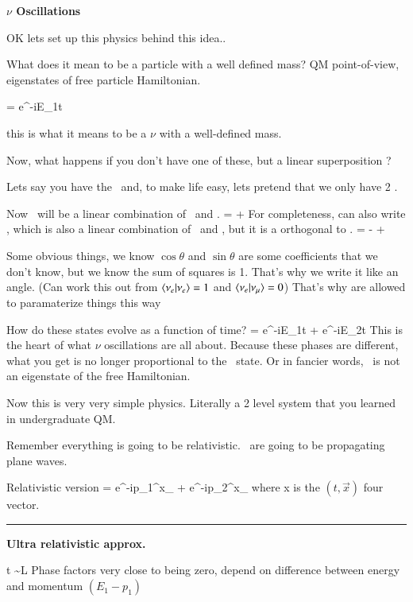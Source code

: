{\textbf{$\nu$ Oscillations}

OK lets set up this physics behind this idea.. 

What does it mean to be a particle with a well defined mass?
QM point-of-view, eigenstates of free particle Hamiltonian. 

\be
{} =  e^{-iE_1t} \ket{\nuone}
\ee

this is what it means to be a $\nu$ with a well-defined mass.

Now, what happens if you don't have one of these, but a linear superposition  ?

Lets say you have the \nue\ and, to make life easy, lets pretend that we only have 2 \nus. 

Now \nue\ will be a linear combination of \nuone\ and \nutwo. 
\be
\ket{\nue} = \cos\theta \ket{\nuone} + \sin\theta \ket{\nutwo}
\ee
For completeness, can also write \numu, which is also a linear combination of \nuone\ and \nutwo, but it is a orthogonal to \nue.
\be
\ket{\numu} = -\sin\theta \ket{\nuone} + \cos\theta \ket{\nutwo}
\ee


Some obvious things, we know $\cos\theta$ and $\sin\theta$ are some coefficients that we don't know, but we know the sum of squares is 1. 
That's why we write it like an angle.
(Can work this out from  $\braket{\nu_e | \nu_e}  = 1$ and $\braket{\nu_e | \nu_\mu}  = 0$)
That's why are allowed to paramaterize things this way

How do these states evolve as a function of time?
\be
{} = \cos\theta e^{-iE_1t} \ket{\nuone} + \sin\theta e^{-iE_2t}\ket{\nutwo}
\ee
This is the heart of what $\nu$ oscillations are all about. 
Because these phases are different, what you get is no longer proportional to the \nue\ state.
Or in fancier words, \nue\ is not an eigenstate of the free Hamiltonian.

Now this is very very simple physics. 
Literally a 2 level system that you learned in undergraduate QM.


Remember everything is going to be relativistic. 
\nus\ are going to be propagating plane waves. 

Relativistic version 
\be
{} = \cos\theta e^{-ip_1^\mu x_\mu} \ket{\nuone} + \sin\theta e^{-ip_2^\mu x_\mu}\ket{\nutwo}
\ee
where x is the $(t,\vec{x})$ four vector. 

\noindent\rule{\textwidth}{1pt}

\textbf{Ultra relativistic approx. }

\be
t \sim L 
\ee
Phase factors very close to being zero, depend on difference between energy and momentum $(E_1 - p_1)$


}
